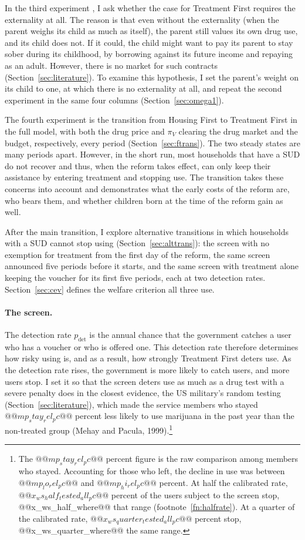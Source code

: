 \documentclass[10pt]{article}
\begin{document}
 In the third experiment , I ask whether the case for Treatment First  requires the externality at all.  The reason is that even without the externality (when the parent  weighs its child as much as  itself), the parent still values its own drug use,  and its child does not. If it could, the child  might want to pay its parent to  stay sober during its childhood, by borrowing against its future income and repaying as an adult. However,  there is  no market for such contracts (Section~\ref{sec:literature}). To  examine this hypothesis, I set the parent's weight on its child to one, at which there is no externality at all, and repeat the second experiment in the same four columns (Section~\ref{sec:omega1}).

The fourth experiment is the transition from Housing First to Treatment First in the full model, with both the drug price and $\pi_V$ clearing the drug market and the budget, respectively, every period (Section~\ref{sec:ftrans}).   The two steady states are many periods apart. However, in the short run, most households that have a SUD do not recover and thus, when the reform takes effect, can only keep their assistance by entering treatment and stopping use. The transition takes these concerns into account and demonstrates what the early costs of the reform are, who bears them, and whether children born at the time of the reform gain as well.

After the main transition, I explore alternative transitions in which households with a SUD cannot stop using (Section~\ref{sec:alttrans}): the screen with no exemption for treatment from the first day of the reform, the same screen announced five periods before it starts, and the same screen with treatment alone keeping the voucher for its first five periods, each at two detection rates. Section~\ref{sec:cev} defines the welfare criterion all three use.

\paragraph{The screen.}    The detection rate $p_{\mathrm{det}}$ is the annual chance that the government catches a user who has a voucher or who is offered one. This detection rate therefore determines how risky using is, and as a result, how strongly Treatment First deters use. As the detection rate rises, the government is more likely to catch users, and more users stop. I set it so that the screen deters use as much as a drug test with a severe penalty does in the closest evidence, the US military's random testing (Section~\ref{sec:literature}), which made the service members who stayed  $@@mp_stay_rel_pc@@$ percent less likely to use marijuana in the past year than the non-treated group (Mehay and Pacula, 1999).\footnote{  The $@@mp_stay_rel_pc@@$ percent figure is the raw comparison among members who stayed. Accounting for those who left, the decline in use was between $@@mp_lo_rel_pc@@$ and $@@mp_hi_rel_pc@@$ percent. At half the calibrated rate, $@@x_ws_half_tested_all_pc@@$ percent of the users subject to the screen stop, @@x_ws_half_where@@ that range (footnote~\ref{fn:halfrate}). At a quarter of the calibrated rate,
$@@x_ws_quarter_tested_all_pc@@$ percent stop, @@x_ws_quarter_where@@ the same range.}
\end{document}
